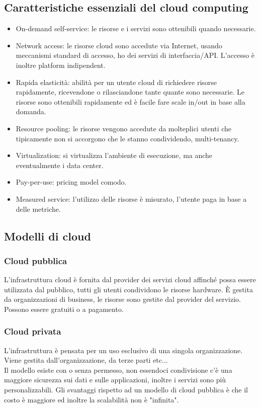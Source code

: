 \documentclass[16px]{article}
\begin{document}
\subsection{Caratteristiche essenziali del cloud computing}
\begin{itemize}
\item On-demand self-service: le risorse e i servizi sono ottenibili quando necessarie.
\item Network access: le risorse cloud sono accedute via Internet, usando meccanismi standard di accesso, ho dei servizi di interfaccia/API. L'accesso è inoltre platform indipendent.
\item Rapida elasticità: abilità per un utente cloud di richiedere risorse rapidamente, ricevendone o rilasciandone tante quante sono necessarie. Le risorse sono ottenibili rapidamente ed è facile fare scale in/out in base alla domanda.
\item Resource pooling: le risorse vengono accedute da molteplici utenti che tipicamente non si accorgono che le stanno condividendo, multi-tenancy.
\item Virtualization: si virtualizza l'ambiente di esecuzione, ma anche eventualmente i data center.
\item Pay-per-use: pricing model comodo.
\item Measured service: l'utilizzo delle risorse è misurato, l'utente paga in base a delle metriche.
\end{itemize} 
\subsection{Modelli di cloud}
\subsubsection{Cloud pubblica}
L'infrastruttura cloud è fornita dal provider dei servizi cloud affinché possa essere utilizzata dal pubblico, tutti gli utenti condividono le risorse hardware. È gestita da organizzazioni di business, le risorse sono gestite dal provider del servizio. Possono essere gratuiti o a pagamento.
\subsubsection{Cloud privata}
L'infrastruttura è pensata per un uso esclusivo di una singola organizzazione. Viene gestita dall'organizzazione, da terze parti etc...\\ Il modello esiste con o senza permesso, non essendoci condivisione c'è una maggiore sicurezza sui dati e sulle applicazioni, inoltre i servizi sono più personalizzabili. Gli svantaggi rispetto ad un modello di cloud pubblica  è che il costo è maggiore ed inoltre la scalabilità non è "infinita".
\end{document}
